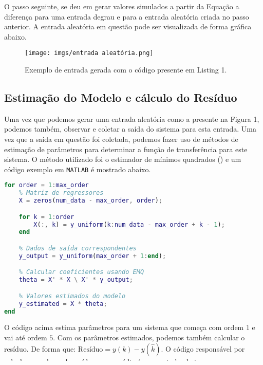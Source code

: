\documentclass[a4paper,12pt]{article}
\begin{document}
O passo seguinte, se deu em gerar valores simulados a partir da Equação a diferença para uma entrada degrau e para a entrada aleatória criada no passo anterior. A entrada aleatória em questão pode ser visualizada de forma gráfica abaixo.

\begin{figure}[h!]\label{fig1}
  \centering
  \texttt{[image: imgs/entrada aleatória.png]}
  \caption{Exemplo de entrada gerada com o código presente em Listing 1.}
\end{figure}

\subsection{Estimação do Modelo e cálculo do Resíduo}\label{3.4}

Uma vez que podemos gerar uma entrada aleatória como a presente na Figura 1, podemos também, observar e coletar a saída do sistema para esta entrada. Uma vez que a saída em questão foi coletada, podemos fazer uso de métodos de estimação de parâmetros para determinar a função de transferência para este sistema. O método utilizado foi o estimador de mínimos quadrados () e um código exemplo em \texttt{MATLAB} é mostrado abaixo.

\begin{lstlisting}[language=Matlab, caption=Estimador de mínimos quadrados]
for order = 1:max_order
    % Matriz de regressores
    X = zeros(num_data - max_order, order);

    for k = 1:order
        X(:, k) = y_uniform(k:num_data - max_order + k - 1);
    end

    % Dados de saída correspondentes
    y_output = y_uniform(max_order + 1:end);

    % Calcular coeficientes usando EMQ
    theta = X' * X \ X' * y_output;

    % Valores estimados do modelo
    y_estimated = X * theta;
end
\end{lstlisting}

\newpage
O código acima estima parâmetros para um sistema que começa com ordem $1$ e vai até ordem $5$. Com os parâmetros estimados, podemos também calcular o resíduo. De forma que: $\text{Resíduo} = y(k) - y(\hat{k})$. O código responsável por calcular os valores de resíduo e sua média é apresentado abaixo.
\end{document}
